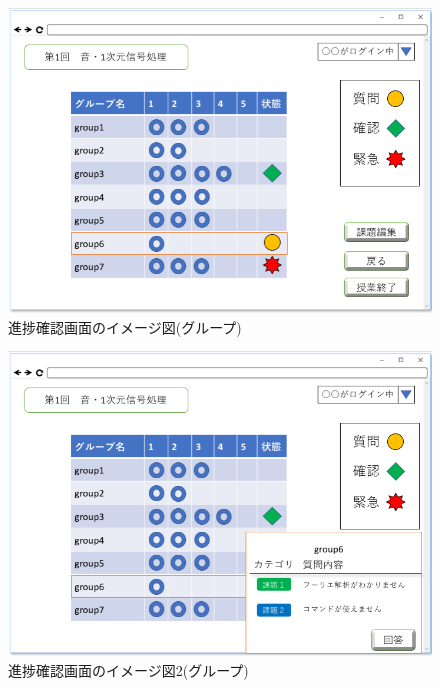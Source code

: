 \begin{figure}[phtbp]
  \begin{center}
    \includegraphics[width=1\linewidth,clip]{./img/20.png}
    \caption{進捗確認画面のイメージ図(グループ)}\label{fig:20}
  \end{center}
\end{figure}

\begin{figure}[phtbp]
  \begin{center}
    \includegraphics[width=1\linewidth,clip]{./img/21.png}
    \caption{進捗確認画面のイメージ図2(グループ)}\label{fig:21}
  \end{center}
\end{figure}

